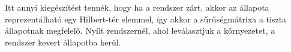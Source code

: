   Itt annyi kiegészítést tennék, hogy ha a rendszer zárt, akkor az állapota reprezentálható egy Hilbert-tér elemmel, így akkor a sűrűségmátrixa a tiszta állapotnak megfelelő. Nyílt rendszernél, ahol leválasztjuk a környezetet, a rendszer kevert állapotba kerül. 
%   
%   
%   
%   
%   
%   
